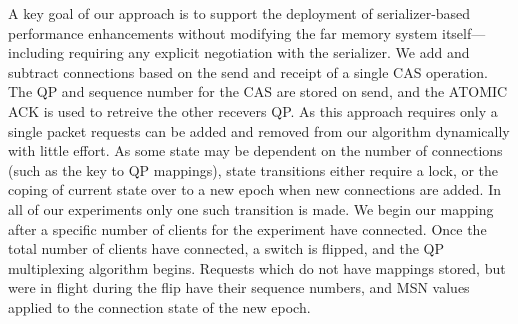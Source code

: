 A key goal of our approach is to support the deployment of
serializer-based performance enhancements without modifying the far
memory system itself---including requiring any explicit negotiation
with the serializer.
We add and subtract connections based on the send
and receipt of a single CAS operation. The QP and sequence number for
the CAS are stored on send, and the ATOMIC ACK is used to retreive the
other recevers QP. As this approach requires only a single packet
requests can be added and removed from our algorithm dynamically with
little effort. As some state may be dependent on the number of
connections (such as the key to QP mappings), state transitions either
require a lock, or the coping of current state over to a new epoch
when new connections are added. In all of our experiments only one
such transition is made. We begin our mapping after a specific number
of clients for the experiment have connected. Once the total number of
clients have connected, a switch is flipped, and the QP multiplexing
algorithm begins. Requests which do not have mappings stored, but were
in flight during the flip have their sequence numbers, and MSN values
applied to the connection state of the new epoch.







